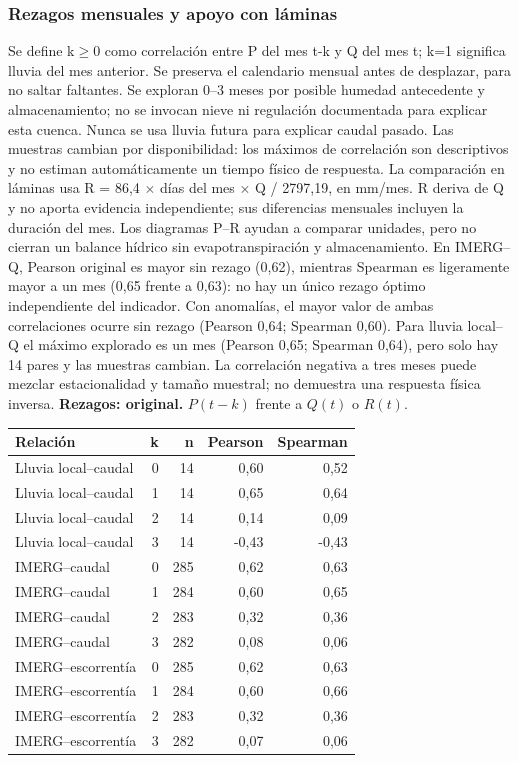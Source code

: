 \subsubsection*{Rezagos mensuales y apoyo con láminas}
Se define k$\geq$0 como correlación entre P del mes t-k y Q del mes t; k=1 significa lluvia del mes anterior. Se preserva el calendario mensual antes de desplazar, para no saltar faltantes. Se exploran 0--3 meses por posible humedad antecedente y almacenamiento; no se invocan nieve ni regulación documentada para explicar esta cuenca. Nunca se usa lluvia futura para explicar caudal pasado. Las muestras cambian por disponibilidad: los máximos de correlación son descriptivos y no estiman automáticamente un tiempo físico de respuesta. La comparación en láminas usa R = 86,4 $\times$ días del mes $\times$ Q / 2797,19, en mm/mes. R deriva de Q y no aporta evidencia independiente; sus diferencias mensuales incluyen la duración del mes. Los diagramas P--R ayudan a comparar unidades, pero no cierran un balance hídrico sin evapotranspiración y almacenamiento. En IMERG--Q, Pearson original es mayor sin rezago (0,62), mientras Spearman es ligeramente mayor a un mes (0,65 frente a 0,63): no hay un único rezago óptimo independiente del indicador. Con anomalías, el mayor valor de ambas correlaciones ocurre sin rezago (Pearson 0,64; Spearman 0,60). Para lluvia local--Q el máximo explorado es un mes (Pearson 0,65; Spearman 0,64), pero solo hay 14 pares y las muestras cambian. La correlación negativa a tres meses puede mezclar estacionalidad y tamaño muestral; no demuestra una respuesta física inversa.
\textbf{Rezagos: original.} $P(t-k)$ frente a $Q(t)$ o $R(t)$.
\begin{center}\small\begin{tabular}{lrrrr}\hline
Relación & k & n & Pearson & Spearman \\ \hline
Lluvia local--caudal & 0 & 14 & 0,60 & 0,52 \\
Lluvia local--caudal & 1 & 14 & 0,65 & 0,64 \\
Lluvia local--caudal & 2 & 14 & 0,14 & 0,09 \\
Lluvia local--caudal & 3 & 14 & -0,43 & -0,43 \\
IMERG--caudal & 0 & 285 & 0,62 & 0,63 \\
IMERG--caudal & 1 & 284 & 0,60 & 0,65 \\
IMERG--caudal & 2 & 283 & 0,32 & 0,36 \\
IMERG--caudal & 3 & 282 & 0,08 & 0,06 \\
IMERG--escorrentía & 0 & 285 & 0,62 & 0,63 \\
IMERG--escorrentía & 1 & 284 & 0,60 & 0,66 \\
IMERG--escorrentía & 2 & 283 & 0,32 & 0,36 \\
IMERG--escorrentía & 3 & 282 & 0,07 & 0,06 \\
\hline\end{tabular}\end{center}

